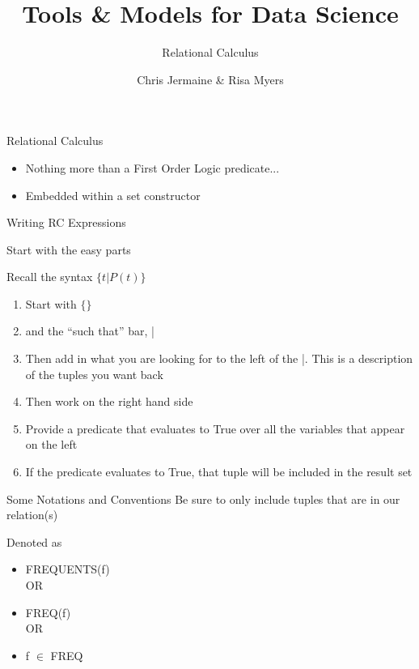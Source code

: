 \documentclass[aspectratio=169]{beamer}
\title[]
{Tools \& Models for Data Science}
\subtitle
{Relational Calculus}
\author[]{Chris Jermaine \& Risa Myers}
\institute
{
  Rice University
}
\date[]{}
\begin{document}
\begin{frame}
 \titlepage
\end{frame}

\begin{frame}{Relational Calculus}

\begin{itemize}
\item Nothing more than a First Order Logic predicate...
\item Embedded within a set constructor
\end{itemize}
\end{frame}
\begin{frame}{Writing RC Expressions}

Start with the easy parts

Recall the syntax $\{ t | P(t) \}$

\begin{enumerate}
\item Start with $\{ \}$
\item and the ``such that'' bar, |
\item  Then add in what you are looking for to the left of the |. 
   This is a description of the tuples you want back
\item  Then work on the right hand side
\item  Provide a predicate that evaluates to True over all the variables that appear on the left
\item If the predicate evaluates to True, that tuple will be included in the result set
\end{enumerate}
\end{frame}


\begin{frame}{Some Notations and Conventions}
Be sure to only include tuples that are in our relation(s)

Denoted as
\begin{itemize}
\item FREQUENTS(f)\\
 
 OR \\

\item FREQ(f)\\

OR\\

\item f $\in$ FREQ
\end{itemize}


\end{frame}
\end{document}
